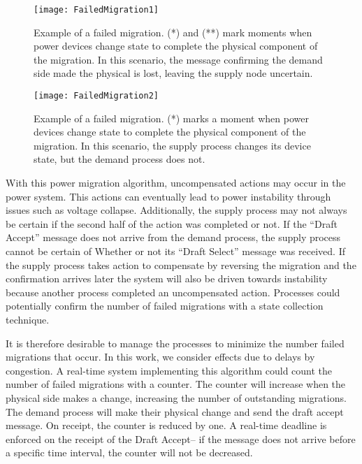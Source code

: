 \begin{figure}
\texttt{[image: FailedMigration1]}
\caption{Example of a failed migration. (*) and (**) mark moments when power devices change state to complete the physical component of the migration. In this scenario, the message confirming the demand side made the physical is lost, leaving the supply node uncertain.} \label{fig:failed-migration-1}
\end{figure}

\begin{figure}
\texttt{[image: FailedMigration2]}
\caption{Example of a failed migration. (*) marks a moment when power devices change state to complete the physical component of the migration. In this scenario, the supply process changes its device state, but the demand process does not.} \label{fig:failed-migration-1}
\end{figure}

With this power migration algorithm, uncompensated actions may occur in the power system.
This actions can eventually lead to power instability through issues such as voltage collapse.
Additionally, the supply process may not always be certain if the second half of the action was completed or not.
If the ``Draft Accept'' message does not arrive from the demand process, the supply process cannot be certain of Whether or not its ``Draft Select'' message was received.
If the supply process takes action to compensate by reversing the migration and the confirmation arrives later the system will also be driven towards instability because another process completed an uncompensated action.
Processes could potentially confirm the number of failed migrations with a state collection technique.

It is therefore desirable to manage the processes to minimize the number failed migrations that occur.
In this work, we consider effects due to delays by congestion.
A real-time system implementing this algorithm could count the number of failed migrations with a counter.
The counter will increase when the physical side makes a change, increasing the number of outstanding migrations.
The demand process will make their physical change and send the draft accept message.
On receipt, the counter is reduced by one.
A real-time deadline is enforced on the receipt of the Draft Accept-- if the message does not arrive before a specific time interval, the counter will not be decreased.

